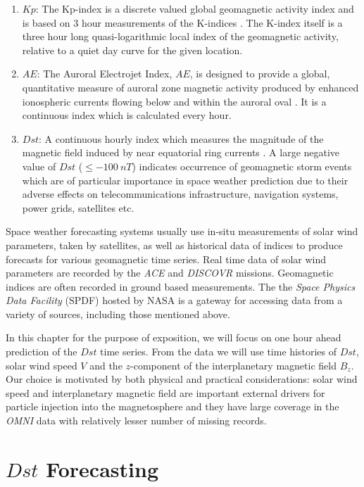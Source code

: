 \documentclass{article}
\begin{document}
\begin{enumerate}
\item $Kp$: The Kp-index is a discrete valued global geomagnetic
  activity index and is based on 3 hour measurements of the
  K-indices \citep{Bartels}. The K-index itself is a three hour
  long quasi-logarithmic local index of the geomagnetic activity,
  relative to a quiet day curve for the given location.
  
\item $AE$: The Auroral Electrojet Index, $AE$, is designed to
  provide a global, quantitative measure of auroral zone magnetic
  activity produced by enhanced ionospheric currents flowing below
  and within the auroral oval \citep{AEIndex}. It is a continuous
  index which is calculated every hour.
  
\item $Dst$: A continuous hourly index which measures the
  magnitude of the magnetic field induced by near equatorial ring
  currents \citep{DesslerAndParker}. A large negative value of
  $Dst$ ($ \leq -100 \ nT$) indicates occurrence of geomagnetic
  storm events which are of particular importance in space weather
  prediction due to their adverse effects on telecommunications
  infrastructure, navigation systems, power grids, satellites etc. 
\end{enumerate}

Space weather forecasting systems usually use in-situ measurements of
solar wind parameters, taken by satellites, as well as historical data
of indices to produce forecasts for various geomagnetic time
series. Real time data of solar wind parameters are recorded by the \emph{ACE}
and \emph{DISCOVR} missions. Geomagnetic indices are often recorded in
ground based measurements. The the \emph{Space Physics Data Facility}
(SPDF) hosted by NASA is a gateway for accessing data from a variety
of sources, including those mentioned above.

In this chapter for the purpose of exposition, we will focus on one
hour ahead prediction of the $Dst$ time series. From the data we will
use time histories of $Dst$, solar wind speed $V$ and the
$z$-component of the interplanetary magnetic field $B_z$. Our choice
is motivated by both physical and practical considerations: solar wind
speed and interplanetary magnetic field are important external drivers
for particle injection into the magnetosphere and they have large
coverage in the \emph{OMNI} data with relatively lesser number of
missing records.

\section{$Dst$ Forecasting}
\end{document}
